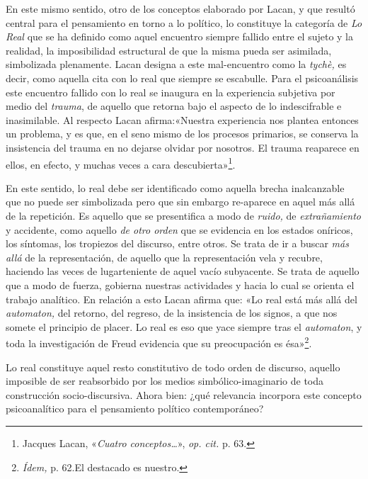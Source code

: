 En este mismo sentido, otro de los conceptos elaborado por Lacan, y que resultó central para el pensamiento en torno a lo político, lo constituye la categoría de \emph{Lo Real} que se ha definido como aquel encuentro siempre fallido entre el sujeto y la realidad, la imposibilidad estructural de que la misma pueda ser asimilada, simbolizada plenamente. Lacan designa a este mal-encuentro como la \emph{tychè,} es decir, como aquella cita con lo real que siempre se escabulle. Para el psicoanálisis este encuentro fallido con lo real se inaugura en la experiencia subjetiva por medio del \emph{trauma}, de aquello que retorna bajo el aspecto de lo indescifrable e inasimilable. Al respecto Lacan afirma:«Nuestra experiencia nos plantea entonces un problema, y es que, en el seno mismo de los procesos primarios, se conserva la insistencia del trauma en no dejarse olvidar por nosotros. El trauma reaparece en ellos, en efecto, y muchas veces a cara descubierta»\footnote{Jacques Lacan, «\emph{Cuatro conceptos\ldots{}}», \emph{op. cit.} p. 63.}.

En este sentido, lo real debe ser identificado como aquella brecha inalcanzable que no puede ser simbolizada pero que sin embargo re-aparece en aquel más allá de la repetición. Es aquello que se presentifica a modo de \emph{ruido,} de \emph{extrañamiento} y accidente, como aquello \emph{de otro orden} que se evidencia en los estados oníricos, los síntomas, los tropiezos del discurso, entre otros. Se trata de ir a buscar \emph{más allá} de la representación, de aquello que la representación vela y recubre, haciendo las veces de lugarteniente de aquel vacío subyacente. Se trata de aquello que a modo de fuerza, gobierna nuestras actividades y hacia lo cual se orienta el trabajo analítico. En relación a esto Lacan afirma que: «Lo real está más allá del \emph{automaton,} del retorno, del regreso, de la insistencia de los signos, a que nos somete el principio de placer. Lo real es eso que yace siempre tras el \emph{automaton}, y toda la investigación de Freud evidencia que su preocupación es ésa»\footnote{\emph{Ídem,} p. 62.El destacado es nuestro.}.

Lo real constituye aquel resto constitutivo de todo orden de discurso, aquello imposible de ser reabsorbido por los medios simbólico-imaginario de toda construcción socio-discursiva. Ahora bien: ¿qué relevancia incorpora este concepto psicoanalítico para el pensamiento político contemporáneo?

